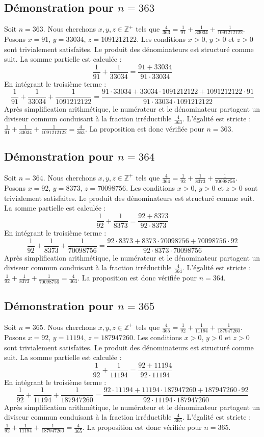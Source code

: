 \documentclass[11pt,a4paper]{article}
\begin{document}
\subsection{Démonstration pour $n = 363$}
Soit $n = 363$. Nous cherchons $x, y, z \in \mathbb{Z}^{+}$ tels que $\frac{4}{363} = \frac{1}{91} + \frac{1}{33034} + \frac{1}{1091212122}$.
Posons $x = 91$, $y = 33034$, $z = 1091212122$.
Les conditions $x > 0$, $y > 0$ et $z > 0$ sont trivialement satisfaites.
Le produit des dénominateurs est structuré comme suit. La somme partielle est calculée :
$$ \frac{1}{91} + \frac{1}{33034} = \frac{91+33034}{91 \cdot 33034} $$
En intégrant le troisième terme :
$$ \frac{1}{91} + \frac{1}{33034} + \frac{1}{1091212122} = \frac{91 \cdot 33034 + 33034 \cdot 1091212122 + 1091212122 \cdot 91}{91 \cdot 33034 \cdot 1091212122} $$
Après simplification arithmétique, le numérateur et le dénominateur partagent un diviseur commun conduisant à la fraction irréductible $\frac{4}{363}$.
L'égalité est stricte : $\frac{1}{91} + \frac{1}{33034} + \frac{1}{1091212122} = \frac{4}{363}$.
La proposition est donc vérifiée pour $n = 363$.
\subsection{Démonstration pour $n = 364$}
Soit $n = 364$. Nous cherchons $x, y, z \in \mathbb{Z}^{+}$ tels que $\frac{4}{364} = \frac{1}{92} + \frac{1}{8373} + \frac{1}{70098756}$.
Posons $x = 92$, $y = 8373$, $z = 70098756$.
Les conditions $x > 0$, $y > 0$ et $z > 0$ sont trivialement satisfaites.
Le produit des dénominateurs est structuré comme suit. La somme partielle est calculée :
$$ \frac{1}{92} + \frac{1}{8373} = \frac{92+8373}{92 \cdot 8373} $$
En intégrant le troisième terme :
$$ \frac{1}{92} + \frac{1}{8373} + \frac{1}{70098756} = \frac{92 \cdot 8373 + 8373 \cdot 70098756 + 70098756 \cdot 92}{92 \cdot 8373 \cdot 70098756} $$
Après simplification arithmétique, le numérateur et le dénominateur partagent un diviseur commun conduisant à la fraction irréductible $\frac{4}{364}$.
L'égalité est stricte : $\frac{1}{92} + \frac{1}{8373} + \frac{1}{70098756} = \frac{4}{364}$.
La proposition est donc vérifiée pour $n = 364$.
\subsection{Démonstration pour $n = 365$}
Soit $n = 365$. Nous cherchons $x, y, z \in \mathbb{Z}^{+}$ tels que $\frac{4}{365} = \frac{1}{92} + \frac{1}{11194} + \frac{1}{187947260}$.
Posons $x = 92$, $y = 11194$, $z = 187947260$.
Les conditions $x > 0$, $y > 0$ et $z > 0$ sont trivialement satisfaites.
Le produit des dénominateurs est structuré comme suit. La somme partielle est calculée :
$$ \frac{1}{92} + \frac{1}{11194} = \frac{92+11194}{92 \cdot 11194} $$
En intégrant le troisième terme :
$$ \frac{1}{92} + \frac{1}{11194} + \frac{1}{187947260} = \frac{92 \cdot 11194 + 11194 \cdot 187947260 + 187947260 \cdot 92}{92 \cdot 11194 \cdot 187947260} $$
Après simplification arithmétique, le numérateur et le dénominateur partagent un diviseur commun conduisant à la fraction irréductible $\frac{4}{365}$.
L'égalité est stricte : $\frac{1}{92} + \frac{1}{11194} + \frac{1}{187947260} = \frac{4}{365}$.
La proposition est donc vérifiée pour $n = 365$.
\end{document}
